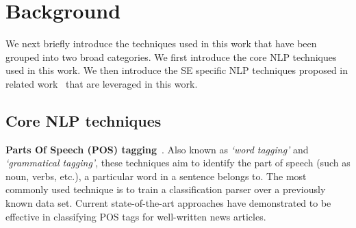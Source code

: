 \section{Background}
\label{sec:background}


We next briefly introduce the techniques used in this work that have been grouped into two broad categories.
We first introduce the core NLP techniques used in this work.
We then introduce the SE specific NLP techniques proposed in related work~\cite{pandita12:inferring,pandita13:WHYPER} that are leveraged in this work.

\subsection{Core NLP techniques}
\label{sub:CoreNLPback}



\textbf{Parts Of Speech (POS) tagging}~\cite{Klein03,KleinNIPS03}. Also known as \textit{`word tagging'} and \textit{`grammatical tagging'}, these techniques aim to identify the part of speech (such as noun, verbs, etc.), a particular word in a sentence belongs to. The most commonly used technique is to train a classification parser over a previously known data set. Current state-of-the-art approaches have demonstrated to be effective in classifying POS tags for well-written news articles.

